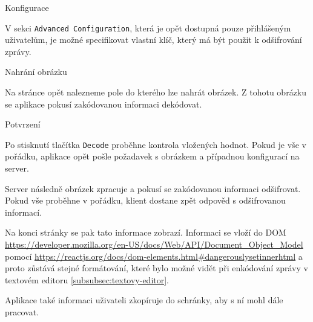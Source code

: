\begin{subsubsection}{Konfigurace}\label{subsubsec:dec-konfigurace}

V sekci \texttt{Advanced Configuration}, která je opět dostupná pouze
přihlášeným uživatelům, je možné specifikovat vlastní klíč, který má být použit
k odšifrování zprávy.

\end{subsubsection}

\begin{subsubsection}{Nahrání obrázku}\label{subsubsec:dec-nahrani-obrazku}

Na stránce opět nalezneme pole do kterého lze nahrát obrázek.
Z tohotu obrázku se aplikace pokusí zakódovanou informaci dekódovat.

\end{subsubsection}

\begin{subsubsection}{Potvrzení}\label{subsubsec:dec-potvrzeni}

Po stisknutí tlačítka \texttt{Decode} proběhne kontrola vložených hodnot.
Pokud je vše v pořádku, aplikace opět pošle požadavek s obrázkem a
případnou konfigurací na server.

Server následně obrázek zpracuje a pokusí se zakódovanou informaci odšifrovat.
Pokud vše proběhne v pořádku, klient dostane zpět odpověd s odšifrovanou
informací.

Na konci stránky se pak tato informace zobrazí.
Informaci se vloží do DOM
\url{https://developer.mozilla.org/en-US/docs/Web/API/Document_Object_Model}
pomocí \url{https://reactjs.org/docs/dom-elements.html\#dangerouslysetinnerhtml}
a proto zůstává stejné formátování, které bylo možné vidět při enkódování
zprávy v textovém editoru \ref{subsubsec:textovy-editor}.

Aplikace také informaci uživateli zkopíruje do schránky, aby s ní mohl dále
pracovat.

\end{subsubsection}
